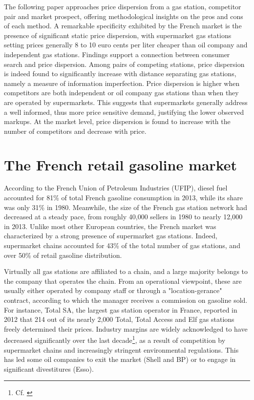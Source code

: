 \documentclass[english]{article}
\begin{document}
The following paper approaches price dispersion from a gas station, competitor pair and market prospect, offering methodological insights on the pros and cons of each method. A remarkable specificity exhibited by the French market is the presence of significant static price dispersion, with supermarket gas stations setting prices generally 8 to 10 euro cents per liter cheaper than oil company and independent gas stations. Findings support a connection between consumer search and price dispersion. Among pairs of competing stations, price dispersion is indeed found to significantly increase with distance separating gas stations, namely a measure of information imperfection. Price dispersion is higher when competitors are both independent or oil company gas stations than when they are operated by supermarkets. This suggests that supermarkets generally address a well informed, thus more price sensitive demand, justifying the lower observed markups. At the market level, price dispersion is found to increase with the number of competitors and decrease with price.

\section{The French retail gasoline market}

According to the French Union of Petroleum Industries (UFIP), diesel fuel accounted for 81\% of total French gasoline consumption in 2013, while its share was only 31\% in 1980. Meanwhile, the size of the French gas station network had decreased at a steady pace, from roughly 40,000 sellers in 1980 to nearly 12,000 in 2013. Unlike most other European countries, the French market was characterized by a strong presence of supermarket gas stations. Indeed, supermarket chains accounted for 43\% of the total number of gas stations, and over 50\% of retail gasoline distribution.

Virtually all gas stations are affiliated to a chain, and a large majority belongs to the company that operates the chain. From an operational viewpoint, these are usually  either operated by company staff or through a "location-gerance" contract, according to which the manager receives a commission on gasoline sold. For instance, Total SA, the largest gas station operator in France, reported in 2012 that 214 out of its nearly 2,000 Total, Total Access and Elf gas stations freely determined their prices. Industry margins are widely acknowledged to have decreased significantly over the last decade\footnote{Cf. \cite{BEL12}}, as a result of competition by supermarket chains and increasingly stringent environmental regulations. This has led some oil companies to exit the market (Shell and BP) or to engage in significant divestitures (Esso).
\end{document}
